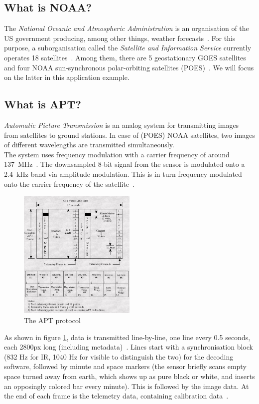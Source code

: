 \documentclass[conference]{IEEEtran}
\begin{document}
\subsection{What is NOAA?}
The \textit{National Oceanic and Atmospheric Administration} is an organisation of the US government producing, among other things, weather forecasts~\cite{NOAA19agency}. For this purpose, a suborganisation called the \textit{Satellite and Information Service} currently operates 18 satellites~\cite{NOAA19currently}. Among them, there are 5 geostationary GOES satellites and four NOAA sun-synchronous polar-orbiting satellites (POES)~\cite{NOAA19satellites}. We will focus on the latter in this application example.
\subsection{What is APT?}
\textit{Automatic Picture Transmission} is an analog system for transmitting images from satellites to ground stations. In case of (POES) NOAA satellites, two images of different wavelengths are transmitted simultaneously.\\
The system uses frequency modulation with a carrier frequency of around 137~MHz~\cite{NOAA19status}. The downsampled 8-bit signal from the sensor is modulated onto a 2.4~kHz band via amplitude modulation. This is in turn frequency modulated onto the carrier frequency of the satellite~\cite{NOAA19building}.\\
\begin{figure}
\centering
\caption{The APT protocol~\cite{NOAA19building}} \label{fig:aptprotocol}
\includegraphics[width=0.5\textwidth]{apt_protocol}
\end{figure}
As shown in figure \ref{fig:aptprotocol}, data is transmitted line-by-line, one line every 0.5 seconds, each 2800px long (including metadata)~\cite[2p]{dascal2012advanced}. Lines start with a synchronisation block (832 Hz for IR, 1040 Hz for visible to distinguish the two) for the decoding software, followed by minute and space markers (the sensor briefly scans empty space turned away from earth, which shows up as pure black or white, and inserts an opposingly colored bar every minute). This is followed by the image data. At the end of each frame is the telemetry data, containing calibration data~\cite[41pp]{NOAA19building}.
\end{document}
